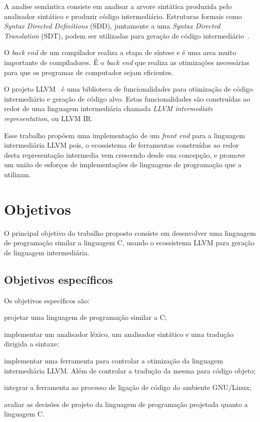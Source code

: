 \documentclass[
  12pt,
  openright,
  twoside,
  a4paper,
  english,
  brazil
]{abntex2}
\begin{document}
A analise semântica consiste em analisar a arvore sintática produzida pelo analisador sintático e produzir código intermediário.
Estruturas formais como \textit{Syntax Directed Definitions} (SDD), juntamente a uma \textit{Syntax Directed Translation} (SDT), podem ser utilizadas para geração de código intermediário~\cite{Aho:2006:CPT:1177220}.

O \textit{back end} de um compilador realiza a etapa de síntese e é uma area muito importante de compiladores.
É o \textit{back end} que realiza as otimizações necessárias para que os programas de computador sejam eficientes.

O projeto LLVM~\cite{lattner2004llvm} é uma biblioteca de funcionalidades para otimização de código intermediário e geração de código alvo.
Estas funcionalidades são construídas ao redor de uma linguagem intermediária chamada \textit{LLVM intermediate representation}, ou LLVM IR\@.

Esse trabalho propõem uma implementação de um \textit{front end} para a linguagem intermediária LLVM pois,
o ecossistema de ferramentas construídas ao redor desta representação intermedia vem crescendo desde sua concepção,
e promove um união de esforços de implementações de linguagens de programação que a utilizam.

\chapter{Objetivos}\label{cap:objetivos}

O principal objetivo do trabalho proposto consiste em desenvolver uma linguagem de programação similar a linguagem C, usando o ecossistema LLVM para geração de linguagem intermediária.

\section{Objetivos específicos}

Os objetivos específicos são:
\begin{alineas}
  \item projetar uma linguagem de programação similar a C\@;
  \item implementar um analisador léxico, um analisador sintático e uma tradução dirigida a sintaxe;
  \item implementar uma ferramenta para controlar a otimização da linguagem intermediária LLVM\@. Além de controlar a tradução da mesma para código objeto;
  \item integrar a ferramenta ao processo de ligação de código do ambiente GNU/Linux;
  \item avaliar as decisões de projeto da linguagem de programação projetada quanto a linguagem C.
\end{alineas}
\end{document}
